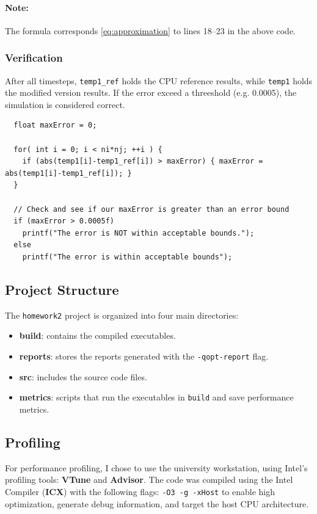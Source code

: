 \paragraph*{Note:} The formula corresponds \eqref{eq:approximation} to lines 18–23 in the above code.

\subsubsection*{Verification}
After all timesteps, \texttt{temp1\_ref} holds the CPU reference results, while \texttt{temp1} holds the modified version results. If the error exceed a threeshold (e.g. 0.0005), the simulation is considered correct.

\begin{lstlisting}
  float maxError = 0;

  for( int i = 0; i < ni*nj; ++i ) {
    if (abs(temp1[i]-temp1_ref[i]) > maxError) { maxError = abs(temp1[i]-temp1_ref[i]); }
  }

  // Check and see if our maxError is greater than an error bound
  if (maxError > 0.0005f)
    printf("The error is NOT within acceptable bounds.");
  else
    printf("The error is within acceptable bounds");
\end{lstlisting}

\subsection{Project Structure}
The \texttt{homework2} project is organized into four main directories:
\begin{itemize}
    \item \textbf{build}: contains the compiled executables.
    \item \textbf{reports}: stores the reports generated with the \texttt{-qopt-report} flag.
    \item \textbf{src}: includes the source code files.
    \item \textbf{metrics}: scripts that run the executables in \texttt{build} and save performance metrics.
\end{itemize}

\subsection{Profiling}
For performance profiling, I chose to use the university workstation, using Intel's profiling tools: \textbf{VTune} and \textbf{Advisor}. The code was compiled using the Intel Compiler (\textbf{ICX}) with the following flags: \texttt{-O3 -g -xHost} to enable high optimization, generate debug information, and target the host CPU architecture.

